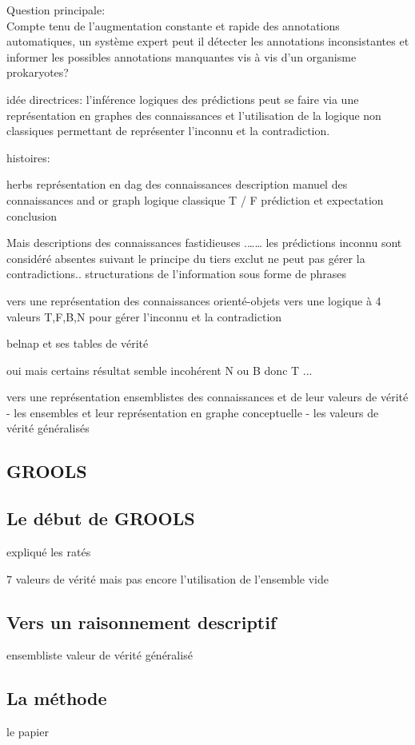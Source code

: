 Question principale:\\
Compte tenu de l'augmentation constante et rapide des annotations automatiques, un système expert peut il détecter les annotations inconsistantes et informer les possibles annotations manquantes vis à vis d'un organisme prokaryotes? 

idée directrices:
l'inférence logiques des prédictions peut se faire via une représentation en graphes des connaissances et l'utilisation de la logique non classiques permettant de représenter l'inconnu et la contradiction.

histoires:

herbs
   représentation en dag des connaissances
   description manuel des connaissances
   and or graph 
   logique classique T / F
   prédiction et expectation
   conclusion
   
Mais descriptions des connaissances fastidieuses .…… 
les prédictions inconnu sont considéré absentes suivant le principe du tiers exclut
ne peut pas gérer la contradictions..
structurations de l'information sous forme de phrases

vers une représentation des connaissances orienté-objets
vers une logique à 4 valeurs T,F,B,N pour gérer l'inconnu et la contradiction

belnap et ses tables de vérité

oui mais certains résultat semble incohérent  N ou B donc T ...

vers une représentation ensemblistes des connaissances et de leur valeurs de vérité
  - les ensembles et leur représentation en graphe conceptuelle
  - les valeurs de vérité généralisés

\begin{refsegment}
\chapter{GROOLS}
\section{Le début de GROOLS}
expliqué les ratés



7 valeurs de vérité mais pas encore l'utilisation de l'ensemble vide

\section{Vers un raisonnement descriptif}
ensembliste valeur de vérité généralisé
\section{La méthode}
le papier
\subbibliography
\end{refsegment}